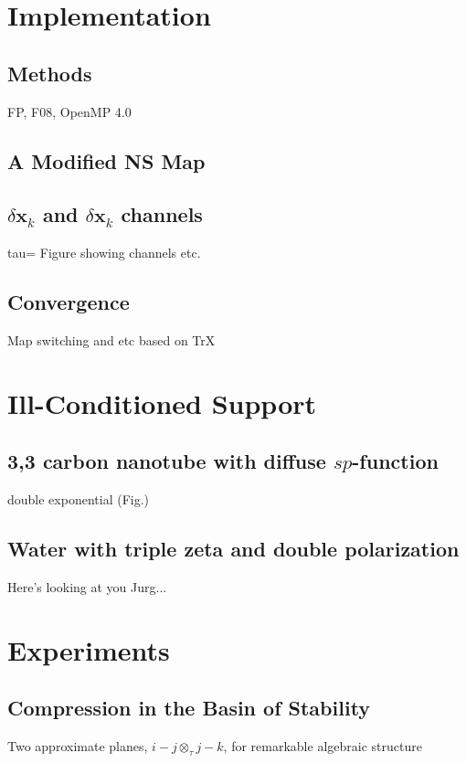 \documentclass[letterpaper,twocolumn,amsmath,amsfont,amssymb,english,aps,jcp,preprintnumbers,groupaddress,nofootinbib,tightenlines]{revtex4}
\newcommand{\mat}[1]{\boldsymbol{#1}}
\newcommand{\ot}{ {\scriptstyle \otimes}_{ \tau } }
\begin{document}
\section{Implementation}

\subsection{Methods}
FP, F08, OpenMP 4.0

\subsection{A Modified NS Map}

\subsection{$\delta \mat{x}_k$ and $\delta \mat{x}_k$ channels}
tau= Figure showing channels etc.  

\subsection{Convergence}
Map switching and etc based on TrX


\section{Ill-Conditioned Support}

\subsection{ 3,3 carbon nanotube with diffuse $sp$-function}
double exponential (Fig.)

\subsection{Water with triple zeta and double polarization}
Here's looking at you Jurg...

\section{Experiments}

\subsection{Compression in the Basin of Stability}

Two approximate planes, $i-j \ot j-k$, for   
remarkable algebraic structure
\end{document}
